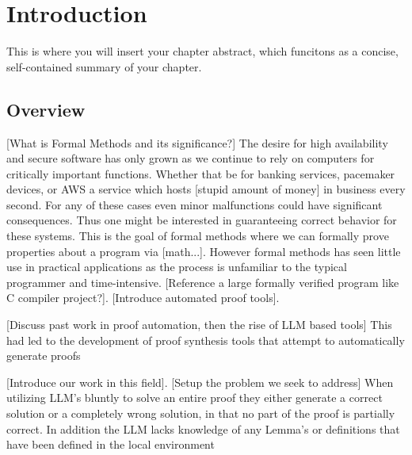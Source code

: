 \chapter{Introduction} %

\begin{chapterabstract}

This is where you will insert your chapter abstract, which funcitons as a concise, self-contained summary of your chapter.


\end{chapterabstract}



% 

\section{Overview}
[What is Formal Methods and its significance?] The desire for high availability and secure software has only grown as we continue to rely on computers for critically important functions. Whether that be 
for banking services, pacemaker devices, or AWS a service which hosts [stupid amount of money] in business every second. For any of these cases even minor malfunctions could have significant consequences.
Thus one might be interested in guaranteeing correct behavior for these systems. This is the goal of formal methods where we can formally prove properties about a program via [math...]. However formal 
methods has seen little use in practical applications as the process is unfamiliar to the typical programmer and time-intensive. [Reference a large formally verified program like C compiler project?]. 
[Introduce automated proof tools].

[Discuss past work in proof automation, then the rise of LLM based tools] This had led to the development of proof synthesis tools that attempt to automatically generate proofs

[Introduce our work in this field].
[Setup the problem we seek to address] When utilizing LLM's bluntly to solve an entire proof they either generate a correct solution or a completely wrong solution, in that no part of the proof is partially correct.
In addition the LLM lacks knowledge of any Lemma's or definitions that have been defined in the local environment

